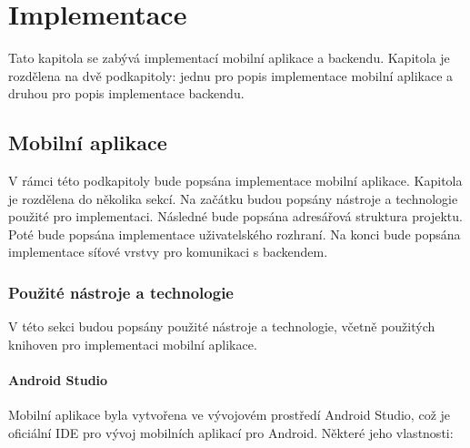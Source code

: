\chapter{Implementace}
\setcounter{page}{1}
\label{ch:implementation}

Tato kapitola se zabývá implementací mobilní aplikace a backendu. Kapitola je rozdělena na dvě podkapitoly: jednu pro popis implementace mobilní aplikace a druhou pro popis implementace backendu.

\section{Mobilní aplikace}

V rámci této podkapitoly bude popsána implementace mobilní aplikace. Kapitola je rozdělena do několika sekcí. Na začátku budou popsány nástroje a technologie použité pro implementaci. Následné bude popsána adresářová struktura projektu. Poté bude popsána implementace uživatelského rozhraní. Na konci bude popsána implementace síťové vrstvy pro komunikaci s backendem.

\subsection{Použité nástroje a technologie}
V této sekci budou popsány použité nástroje a technologie, včetně použitých knihoven pro implementaci mobilní aplikace.

\subsubsection *{Android Studio}
Mobilní aplikace byla vytvořena ve vývojovém prostředí Android Studio, což je oficiální IDE pro vývoj mobilních aplikací pro Android. Některé jeho vlastnosti:

